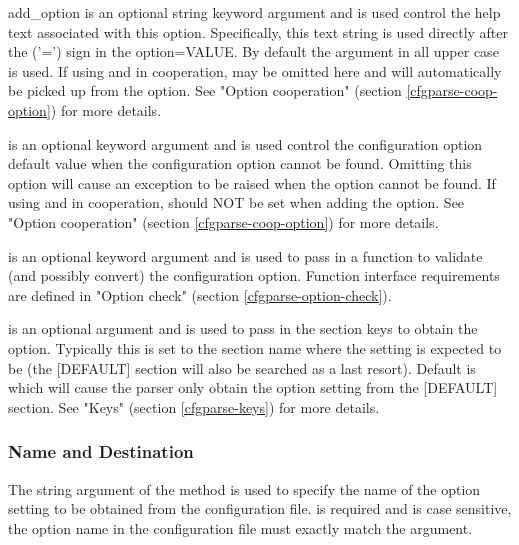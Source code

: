 \documentclass{howto}
\begin{document}
\begin{funcdesc}{add_option}
     is an optional string keyword argument and is used control the
        help text associated with this option.  Specifically, this text
        string is used directly after the \code('=') sign in the option=VALUE.
        By default the  argument in all upper case is used.
        If using  and  in cooperation, 
         may be omitted here and will automatically be picked 
        up from the  option.  See "Option cooperation" (section 
        \ref{cfgparse-coop-option}) for more details.

     is an optional keyword argument and is used control the
        configuration option default value when the configuration option cannot
        be found.  Omitting this option will cause an exception to be raised
        when the option cannot be found.
        If using  and  in cooperation, 
         should NOT be set when adding the  option.
        See "Option cooperation" (section \ref{cfgparse-coop-option}) for more details.
  
     is an optional keyword argument and is used to pass in a
        function to validate (and possibly convert) the configuration option.
        Function interface requirements are defined in "Option check" (section
        \ref{cfgparse-option-check}).

     is an optional argument and is used to pass in the section 
        keys to obtain the option.  Typically this is set to the section
        name where the setting is expected to be (the [DEFAULT] section 
        will also be searched as a last resort).   Default is  
        which will cause the parser only obtain the option setting from the
        [DEFAULT] section.  See "Keys" (section \ref{cfgparse-keys})
        for more details.

\end{funcdesc}

\subsubsection{Name and Destination\label{cfgparse-option-name}}

The  string argument of the  method is used to specify
the name of the option setting to be obtained from the configuration file.
 is required and is case sensitive, the option name in the configuration 
file must exactly match the  argument.
\end{document}
